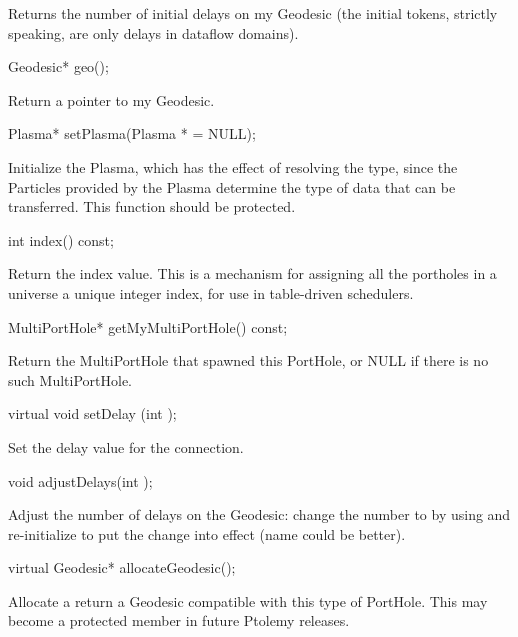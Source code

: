 Returns the number of initial delays on my Geodesic (the initial tokens,
strictly speaking, are only delays in dataflow domains).

\begin{example}
Geodesic* geo();
\end{example}

Return a pointer to my Geodesic.

\begin{example}
Plasma* setPlasma(Plasma * = NULL);
\end{example}

Initialize the Plasma, which has the effect of resolving the type, since
the Particles provided by the Plasma determine the type of data that can
be transferred.  This function should be protected.

\begin{example}
int index() const;
\end{example}

Return the index value.  This is a mechanism for assigning all the
portholes in a universe a unique integer index, for use in table-driven
schedulers.

\begin{example}
MultiPortHole* getMyMultiPortHole() const;
\end{example}

Return the MultiPortHole that spawned this PortHole, or NULL
if there is no such MultiPortHole.

\begin{example}
virtual void setDelay (int );
\end{example}

Set the delay value for the connection.

\begin{example}
void adjustDelays(int );
\end{example}

Adjust the number of delays on the Geodesic: change the number to
 by using  and re-initialize to
put the change into effect (name could be better).

\begin{example}
virtual Geodesic* allocateGeodesic();
\end{example}

Allocate a return a Geodesic compatible with this type of PortHole.
This may become a protected member in future Ptolemy releases.

